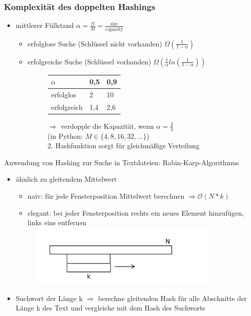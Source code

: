 \documentclass[11pt, fleqn]{scrreprt}
\begin{document}
\subsubsection*{Komplexität des doppelten Hashings}
\begin{itemize}
	\item mittlerer Füllstand $\alpha = \frac{N}{M} = \frac{\text{size}}{\text{capacity}}$
	\begin{itemize}
		\item erfolglose Suche (Schlüssel nicht vorhanden) \hspace*{5mm}$\Omega(\frac{1}{1-\alpha})$
		\item erfolgreiche Suche (Schlüssel vorhanden) \hspace*{5mm}$\Omega(\frac{1}{\alpha} ln(\frac{1}{1-\alpha}))$
		\begin{figure}[htbp]
			\begin{minipage}[t]{7cm}
				\centering
				\vspace{0cm}
				\begin{tabular}{C{2.5cm}|C{1.3cm}|C{1.3cm}|}
					$\alpha$ & 0,5 & 0,9 \\ \hline
					erfolglos & 2 & 10 \\
					erfolgreich & 1,4 & 2,6
				\end{tabular}
			\end{minipage}
			\begin{minipage}[t]{8cm}
				$\Rightarrow$ verdopple die Kapazität, wenn $\alpha = \frac{2}{3}$ \\
				(in Python: $M \in \{4, 8, 16, 32, ...\}$) \\
				2. Hashfunktion sorgt für gleichmäßige Verteilung
			\end{minipage}
		\end{figure}
	\end{itemize}
\end{itemize}
Anwendung von Hashing zur Suche in Textdateien: Rabin-Karp-Algorithmus
\begin{itemize}
	\item ähnlich zu gleitendem Mittelwert
	\begin{itemize}
		\item naiv: für jede Fensterposition Mittelwert berechnen $\Rightarrow \mathcal{O}(N*k)$
		\item elegant: bei jeder Fensterposition rechts ein neues Element hinzufügen, links eins entfernen\\
		\includegraphics[width=10cm,height=3cm,keepaspectratio]{./Pictures/schiebeArray.png}\\
	\end{itemize}
	\item Suchwort der Länge k $\Rightarrow$ berechne gleitenden Hash für alle Abschnitte der Länge k des Text und vergleiche mit dem Hash des Suchworts
\end{itemize}
\end{document}
